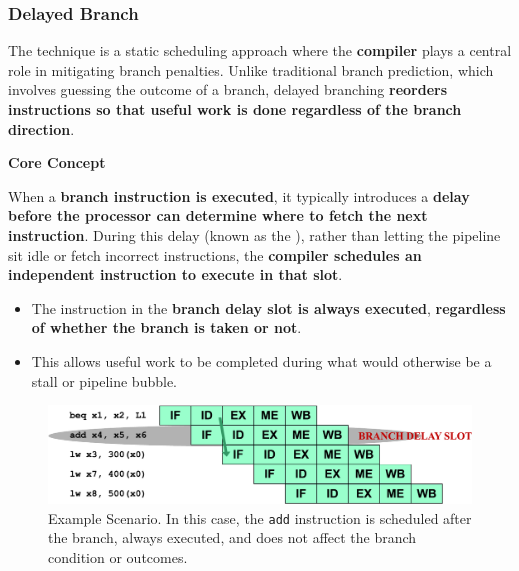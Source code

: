 \subsubsection{Delayed Branch}

The  technique is a static scheduling approach where the \textbf{compiler} plays a central role in mitigating branch penalties. Unlike traditional branch prediction, which involves guessing the outcome of a branch, delayed branching \textbf{reorders instructions so that useful work is done regardless of the branch direction}.

\highspace
\begin{flushleft}
    \textcolor{Green3}{ \textbf{Core Concept}}
\end{flushleft}
When a \textbf{branch instruction is executed}, it typically introduces a \textbf{delay before the processor can determine where to fetch the next instruction}. During this delay (known as the ), rather than letting the pipeline sit idle or fetch incorrect instructions, the \textbf{compiler schedules an independent instruction to execute in that slot}.
\begin{itemize}
    \item The instruction in the \textbf{branch delay slot is always executed}, \textbf{regardless of whether the branch is taken or not}.
    \item This allows useful work to be completed during what would otherwise be a stall or pipeline bubble.
\end{itemize}

\begin{figure}[!htp]
    \centering
    \includegraphics[width=\textwidth]{img/delayed-branch-1.pdf}
    \caption{Example Scenario. In this case, the \texttt{add} instruction is scheduled after the branch, always executed, and does not affect the branch condition or outcomes.}
\end{figure}

